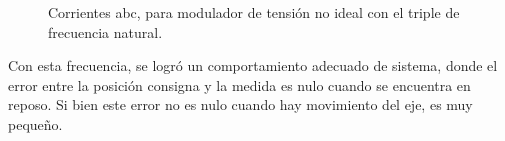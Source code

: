 \documentclass[a4paper, 10pt, onecolumn,journal]{ieeeconf}
\begin{document}
\begin{figure}[H]
	\centering
	\begin{adjustbox}{scale=0.58,max width=\columnwidth}
	\end{adjustbox}
	\caption{Corrientes abc, para modulador de tensión no ideal con el triple de frecuencia natural.}
	\label{Corrientes abc, para modulador de tensión no ideal con el triple de frecuencia natural}
\end{figure}
Con esta frecuencia, se logró un comportamiento adecuado de sistema, donde el error entre la posición consigna y la medida es nulo cuando se encuentra en reposo. Si bien este error no es nulo cuando hay movimiento del eje, es muy pequeño.
\end{document}
